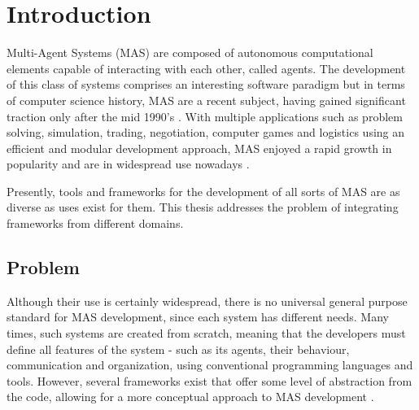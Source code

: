 \chapter{Introduction}
\label{chap:introduction}
Multi-Agent Systems (MAS) are composed of autonomous computational elements capable of interacting with each other, called agents. The development of this class of systems comprises an interesting software paradigm but in terms of computer science history, MAS are a recent subject, having gained significant traction only after the mid 1990's \cite{wooldridge2008introduction}. With multiple applications such as problem solving, simulation, trading, negotiation, computer games and logistics using an efficient and modular development approach, MAS enjoyed a rapid growth in popularity and are in widespread use nowadays \cite{ferber1999multi}.

Presently, tools and frameworks for the development of all sorts of MAS are as diverse as uses exist for them. This thesis addresses the problem of integrating frameworks from different domains.

\section{Problem}

Although their use is certainly widespread, there is no universal general purpose standard for MAS development, since each system has different needs. Many times, such systems are created from scratch, meaning that the developers must define all features of the system - such as its agents, their behaviour, communication and organization, using conventional programming languages and tools. However, several frameworks exist that offer some level of abstraction from the code, allowing for a more conceptual approach to
MAS development \cite{survey2}. 

